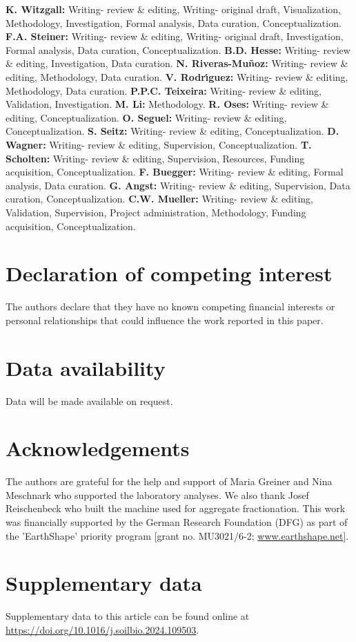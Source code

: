     \textbf{K. Witzgall:} Writing- review \& editing, Writing- original draft, Visualization, Methodology, Investigation, Formal analysis, Data curation, Conceptualization.
    \textbf{F.A. Steiner:} Writing- review \& editing, Writing- original draft, Investigation, Formal analysis, Data curation, Conceptualization.
    \textbf{B.D. Hesse:} Writing- review \& editing, Investigation, Data curation.
    \textbf{N. Riveras-Mu{\~n}oz:} Writing- review \& editing, Methodology, Data curation.
    \textbf{V. Rodr{\'\i}guez:} Writing- review \& editing, Methodology, Data curation. %
    \textbf{P.P.C. Teixeira:} Writing- review \& editing, Validation, Investigation.
    \textbf{M. Li:} Methodology.
    \textbf{R. Oses:} Writing- review \& editing, Conceptualization.
    \textbf{O. Seguel:} Writing- review \& editing, Conceptualization.
    \textbf{S. Seitz:} Writing- review \& editing, Conceptualization.
    \textbf{D. Wagner:} Writing- review \& editing, Supervision, Conceptualization.
    \textbf{T. Scholten:} Writing- review \& editing, Supervision, Resources, Funding acquisition, Conceptualization.
    \textbf{F. Buegger:} Writing- review \& editing, Formal analysis, Data curation.
    \textbf{G. Angst:} Writing- review \& editing, Supervision, Data curation, Conceptualization.
    \textbf{C.W. Mueller:} Writing- review \& editing, Validation, Supervision, Project administration, Methodology, Funding acquisition, Conceptualization.


\section*{Declaration of competing interest}

The authors declare that they have no known competing financial interests or personal relationships that could influence the work reported in this paper.

\section*{Data availability}

Data will be made available on request.

\section*{Acknowledgements}

The authors are grateful for the help and support of Maria Greiner and Nina Meschnark who supported the laboratory analyses. 
We also thank Josef Reischenbeck who built the machine used for aggregate fractionation. This work was financially supported by the German Research Foundation (DFG) as part of the 'EarthShape' priority program [grant no. MU3021/6-2; \url{www.earthshape.net}].

\section*{Supplementary data}

Supplementary data to this article can be found online at \url{https://doi.org/10.1016/j.soilbio.2024.109503}.
